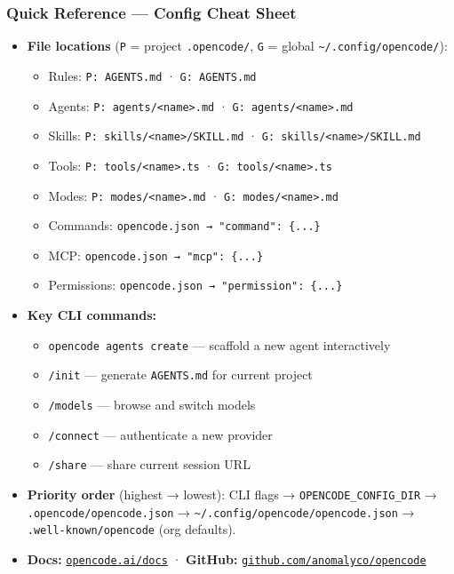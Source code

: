 \begin{frame}[fragile]\frametitle{Quick Reference — Config Cheat Sheet}
  \begin{itemize}
    \item \textbf{File locations} (\texttt{P} = project \texttt{.opencode/}, \texttt{G} = global \texttt{\textasciitilde/.config/opencode/}):
      \begin{itemize}
        \item Rules: \texttt{P: AGENTS.md} · \texttt{G: AGENTS.md}
        \item Agents: \texttt{P: agents/<name>.md} · \texttt{G: agents/<name>.md}
        \item Skills: \texttt{P: skills/<name>/SKILL.md} · \texttt{G: skills/<name>/SKILL.md}
        \item Tools: \texttt{P: tools/<name>.ts} · \texttt{G: tools/<name>.ts}
        \item Modes: \texttt{P: modes/<name>.md} · \texttt{G: modes/<name>.md}
        \item Commands: \texttt{opencode.json → "command": \{...\}}
        \item MCP: \texttt{opencode.json → "mcp": \{...\}}
        \item Permissions: \texttt{opencode.json → "permission": \{...\}}
      \end{itemize}
    \item \textbf{Key CLI commands:}
      \begin{itemize}
        \item \texttt{opencode agents create} — scaffold a new agent interactively
        \item \texttt{/init} — generate \texttt{AGENTS.md} for current project
        \item \texttt{/models} — browse and switch models
        \item \texttt{/connect} — authenticate a new provider
        \item \texttt{/share} — share current session URL
      \end{itemize}
    \item \textbf{Priority order} (highest → lowest): CLI flags → \texttt{OPENCODE\_CONFIG\_DIR} → \texttt{.opencode/opencode.json} → \texttt{\textasciitilde/.config/opencode/opencode.json} → \texttt{.well-known/opencode} (org defaults).
    \item \textbf{Docs:} \href{https://opencode.ai/docs}{\texttt{opencode.ai/docs}} · \textbf{GitHub:} \href{https://github.com/anomalyco/opencode}{\texttt{github.com/anomalyco/opencode}}
  \end{itemize}
\end{frame}

